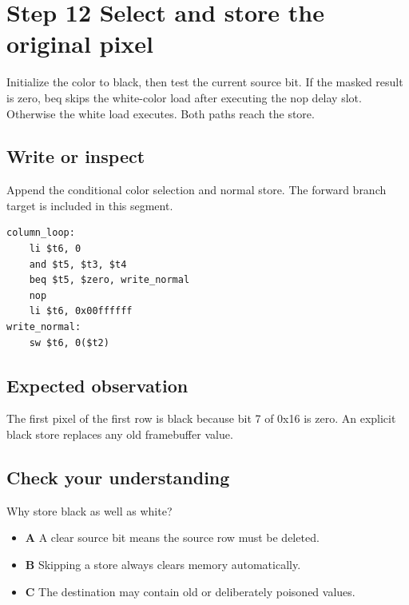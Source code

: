 \section{Step 12 Select and store the original
  pixel}\label{003-eight-byte-sprite-s12-step-12-select-and-store-the-original-pixel}

Initialize the color to black, then test the current source bit. If the
masked result is zero, beq skips the white-color load after executing
the nop delay slot. Otherwise the white load executes. Both paths reach
the store.

\subsection{Write or
  inspect}\label{003-eight-byte-sprite-s12-write-or-inspect}

Append the conditional color selection and normal store. The forward
branch target is included in this segment.

\begin{verbatim}
column_loop:
    li $t6, 0
    and $t5, $t3, $t4
    beq $t5, $zero, write_normal
    nop
    li $t6, 0x00ffffff
write_normal:
    sw $t6, 0($t2)
\end{verbatim}

\subsection{Expected
  observation}\label{003-eight-byte-sprite-s12-expected-observation}

The first pixel of the first row is black because bit 7 of 0x16 is zero.
An explicit black store replaces any old framebuffer value.

\subsection{Check your
  understanding}\label{003-eight-byte-sprite-s12-check-your-understanding}

Why store black as well as white?

\begin{itemize}
  \tightlist
  \item
        \textbf{A} A clear source bit means the source row must be deleted.
  \item
        \textbf{B} Skipping a store always clears memory automatically.
  \item
        \textbf{C} The destination may contain old or deliberately poisoned
        values.
\end{itemize}

